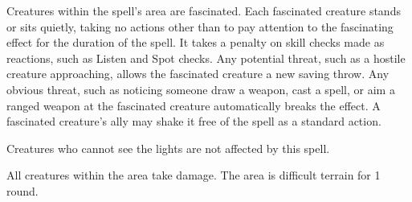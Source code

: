 \spellrng{\rngmed}
\spelldur{\durshort}
\begin{spelleffect}
  Creatures within the spell's area are fascinated. Each fascinated creature stands or sits quietly, taking no actions other than to pay attention to the fascinating effect for the duration of the spell. It takes a  penalty on skill checks made as reactions, such as Listen and Spot checks. Any potential threat, such as a hostile creature approaching, allows the fascinated creature a new saving throw. Any obvious threat, such as noticing someone draw a weapon, cast a spell, or aim a ranged weapon at the fascinated creature automatically breaks the effect. A fascinated creature's ally may shake it free of the spell as a standard action.
\end{spelleffect}
\begin{spellnotes}
  Creatures who cannot see the lights are not affected by this spell.
\end{spellnotes}

\begin{comment}
\subsubsection{I}
\end{comment}

\spellrng{\rngmed}
\begin{spelleffect}
  All creatures within the area take damage. The area is difficult terrain for 1 round.
\end{spelleffect}

